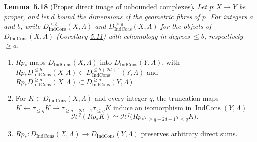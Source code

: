 \documentclass[11pt]{article}
\newenvironment{bpstatement}[2]{\par\addvspace{0.6\baselineskip}\noindent\textbf{#1}#2\textbf{.}\enspace\ignorespaces}
  {\par\addvspace{0.4\baselineskip}}
\newenvironment{bpstatementit}[2]{\begin{bpstatement}{#1}{#2}\itshape\ignorespaces}{\end{bpstatement}}
\providecommand{\Dic}{}\renewcommand{\Dic}{D_{\IndCons}}
\providecommand{\IndCons}{}\renewcommand{\IndCons}{\operatorname{IndCons}}
\begin{document}
\label{bp467}%
\begin{bpstatementit}{Lemma~5.18}{ (Proper direct image of unbounded complexes)}
Let \(p:X\to Y\) be proper, and let \(d\) bound the dimensions of the geometric fibres of \(p\). For integers \(a\) and \(b\), write \(\Dic^{\leq b}(X,\Lambda)\) and \(\Dic^{\geq a}(X,\Lambda)\) for the objects of \(\Dic(X,\Lambda)\) (Corollary \hyperref[bp439]{5.11}) with cohomology in degrees \(\leq b\), respectively \(\geq a\).

\begin{enumerate}
\item \(Rp_*\) maps \(\Dic(X,\Lambda)\) into \(\Dic(Y,\Lambda)\), with \(Rp_*\Dic^{\leq b}(X,\Lambda)\subset\Dic^{\leq b+2d+1}(Y,\Lambda)\) and \(Rp_*\Dic^{\geq a}(X,\Lambda)\subset\Dic^{\geq a}(Y,\Lambda)\).
\item For \(K\in\Dic(X,\Lambda)\) and every integer \(q\), the truncation maps \(K\leftarrow\tau_{\leq q}K\to\tau_{\geq q-2d-1}\tau_{\leq q}K\) induce an isomorphism in \(\IndCons(Y,\Lambda)\) \[
   \mathcal H^q(Rp_*K)\simeq
   \mathcal H^q\bigl(Rp_*\tau_{\geq q-2d-1}\tau_{\leq q}K\bigr).
   \tag{5.6}
   \]
\item \(Rp_*:\Dic(X,\Lambda)\to\Dic(Y,\Lambda)\) preserves arbitrary direct sums.
\end{enumerate}
\end{bpstatementit}
\end{document}
